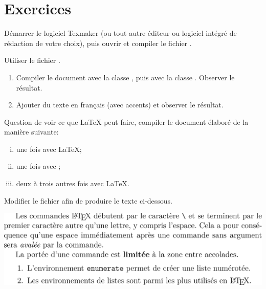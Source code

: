 
\section{Exercices}
\label{sec:presentation:exercices}

\begin{exercice}[nosol]
  Démarrer le logiciel Texmaker (ou tout autre éditeur ou logiciel
  intégré de rédaction de votre choix), puis ouvrir et compiler le
  fichier .
\end{exercice}

\begin{exercice}[nosol]
  Utiliser le fichier .
  \begin{enumerate}
  \item Compiler le document avec la classe , puis avec
    la classe . Observer le résultat.
  \item Ajouter du texte en français (avec accents) et observer le
    résultat.
  \end{enumerate}
\end{exercice}

\begin{exercice}[nosol]
  Question de voir ce que {\LaTeX} peut faire, compiler le document
  élaboré  de la manière suivante:
  \begin{enumerate}[i)]
  \item une fois avec {\LaTeX};
  \item une fois avec {\BibTeX};
  \item deux à trois autres fois avec {\LaTeX}.
  \end{enumerate}
\end{exercice}

\begin{exercice}[nosol]
  \label{ex:base:commandes}
  Modifier le fichier  afin
  de produire le texte ci-dessous.
  \begin{center}
    \includegraphics[width=0.95\linewidth]{exercice_commandes-output}
  \end{center}
\end{exercice}

